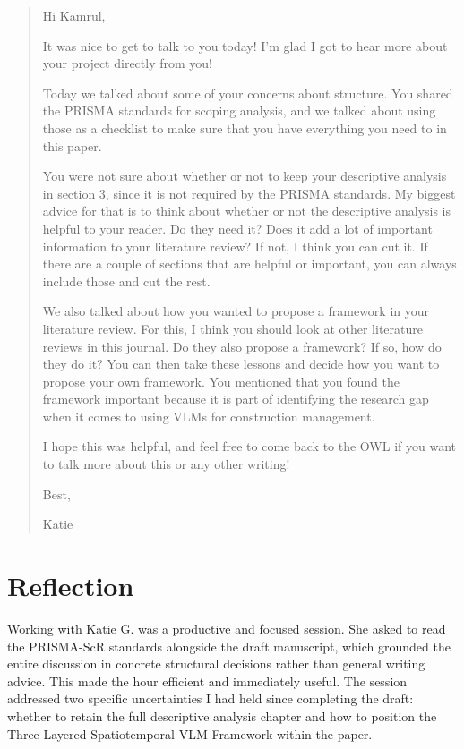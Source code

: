 \documentclass[11pt]{article}
\begin{document}
\begin{quote}
Hi Kamrul,

It was nice to get to talk to you today! I'm glad I got to hear more about your project directly from you!

Today we talked about some of your concerns about structure. You shared the PRISMA standards for scoping analysis, and we talked about using those as a checklist to make sure that you have everything you need to in this paper.

You were not sure about whether or not to keep your descriptive analysis in section 3, since it is not required by the PRISMA standards. My biggest advice for that is to think about whether or not the descriptive analysis is helpful to your reader. Do they need it? Does it add a lot of important information to your literature review? If not, I think you can cut it. If there are a couple of sections that are helpful or important, you can always include those and cut the rest.

We also talked about how you wanted to propose a framework in your literature review. For this, I think you should look at other literature reviews in this journal. Do they also propose a framework? If so, how do they do it? You can then take these lessons and decide how you want to propose your own framework. You mentioned that you found the framework important because it is part of identifying the research gap when it comes to using VLMs for construction management.

I hope this was helpful, and feel free to come back to the OWL if you want to talk more about this or any other writing!

Best,

Katie
\end{quote}

\section*{Reflection}

Working with Katie G. was a productive and focused session. She asked to read the PRISMA-ScR standards alongside the draft manuscript, which grounded the entire discussion in concrete structural decisions rather than general writing advice. This made the hour efficient and immediately useful. The session addressed two specific uncertainties I had held since completing the draft: whether to retain the full descriptive analysis chapter and how to position the Three-Layered Spatiotemporal VLM Framework within the paper.
\end{document}
